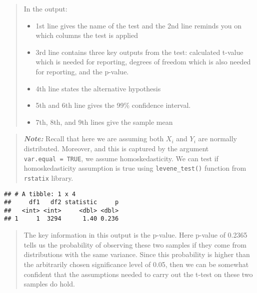 \documentclass[
]{article}
\newenvironment{Shaded}{\begin{snugshade}}{\end{snugshade}}
\newcommand{\AttributeTok}[1]{\textcolor[rgb]{0.13,0.29,0.53}{#1}}
\newcommand{\CommentTok}[1]{\textcolor[rgb]{0.56,0.35,0.01}{\textit{#1}}}
\newcommand{\FunctionTok}[1]{\textcolor[rgb]{0.13,0.29,0.53}{\textbf{#1}}}
\newcommand{\NormalTok}[1]{#1}
\newcommand{\OtherTok}[1]{\textcolor[rgb]{0.56,0.35,0.01}{#1}}
\newcommand{\SpecialCharTok}[1]{\textcolor[rgb]{0.81,0.36,0.00}{\textbf{#1}}}
\providecommand{\tightlist}{%
  \setlength{\itemsep}{0pt}\setlength{\parskip}{0pt}}
\begin{document}
\begin{quote}
In the output:

\begin{itemize}
\tightlist
\item
  1st line gives the name of the test and the 2nd line reminds you on
  which columns the test is applied
\item
  3rd line contains three key outputs from the test: calculated t-value
  which is needed for reporting, degrees of freedom which is also needed
  for reporting, and the p-value.
\item
  4th line states the alternative hypothesis
\item
  5th and 6th line gives the 99\% confidence interval.
\item
  7th, 8th, and 9th lines give the sample mean
\end{itemize}
\end{quote}

\begin{quote}
\textbf{\emph{Note:}} Recall that here we are assuming both \(X_i\) and
\(Y_i\) are normally distributed. Moreover, and this is captured by the
argument \texttt{var.equal\ =\ TRUE}, we assume homoskedasticity. We can
test if homoskedasticity assumption is true using
\texttt{levene\_test()} function from \texttt{rstatix} library.
\end{quote}

\begin{Shaded}
\end{Shaded}

\begin{verbatim}
## # A tibble: 1 x 4
##     df1   df2 statistic     p
##   <int> <int>     <dbl> <dbl>
## 1     1  3294      1.40 0.236
\end{verbatim}

\begin{quote}
The key information in this output is the p-value. Here p-value of
0.2365 tells us the probability of observing these two samples if they
come from distributions with the same variance. Since this probability
is higher than the arbitrarily chosen significance level of 0.05, then
we can be somewhat confident that the assumptions needed to carry out
the t-test on these two samples do hold.
\end{quote}
\end{document}

